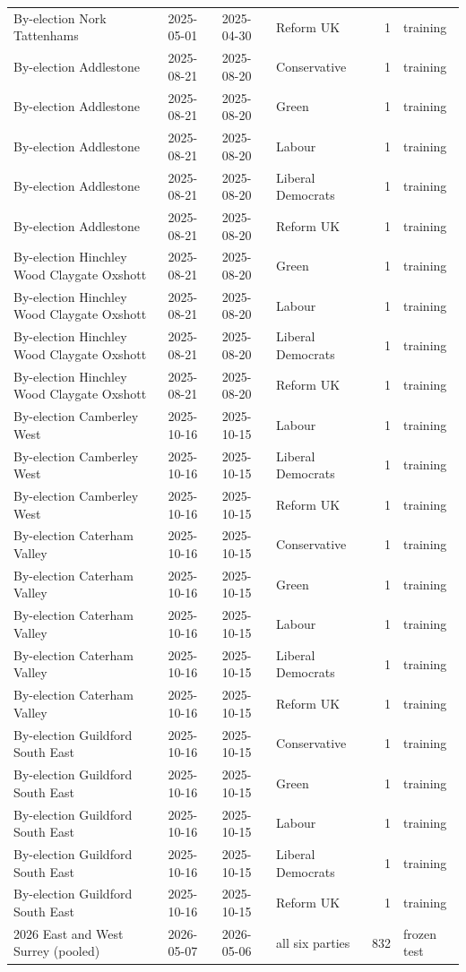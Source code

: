 \begin{tabular}{llllrl}
By-election Nork Tattenhams & 2025-05-01 & 2025-04-30 & Reform UK & 1 & training \\
By-election Addlestone & 2025-08-21 & 2025-08-20 & Conservative & 1 & training \\
By-election Addlestone & 2025-08-21 & 2025-08-20 & Green & 1 & training \\
By-election Addlestone & 2025-08-21 & 2025-08-20 & Labour & 1 & training \\
By-election Addlestone & 2025-08-21 & 2025-08-20 & Liberal Democrats & 1 & training \\
By-election Addlestone & 2025-08-21 & 2025-08-20 & Reform UK & 1 & training \\
By-election Hinchley Wood Claygate Oxshott & 2025-08-21 & 2025-08-20 & Green & 1 & training \\
By-election Hinchley Wood Claygate Oxshott & 2025-08-21 & 2025-08-20 & Labour & 1 & training \\
By-election Hinchley Wood Claygate Oxshott & 2025-08-21 & 2025-08-20 & Liberal Democrats & 1 & training \\
By-election Hinchley Wood Claygate Oxshott & 2025-08-21 & 2025-08-20 & Reform UK & 1 & training \\
By-election Camberley West & 2025-10-16 & 2025-10-15 & Labour & 1 & training \\
By-election Camberley West & 2025-10-16 & 2025-10-15 & Liberal Democrats & 1 & training \\
By-election Camberley West & 2025-10-16 & 2025-10-15 & Reform UK & 1 & training \\
By-election Caterham Valley & 2025-10-16 & 2025-10-15 & Conservative & 1 & training \\
By-election Caterham Valley & 2025-10-16 & 2025-10-15 & Green & 1 & training \\
By-election Caterham Valley & 2025-10-16 & 2025-10-15 & Labour & 1 & training \\
By-election Caterham Valley & 2025-10-16 & 2025-10-15 & Liberal Democrats & 1 & training \\
By-election Caterham Valley & 2025-10-16 & 2025-10-15 & Reform UK & 1 & training \\
By-election Guildford South East & 2025-10-16 & 2025-10-15 & Conservative & 1 & training \\
By-election Guildford South East & 2025-10-16 & 2025-10-15 & Green & 1 & training \\
By-election Guildford South East & 2025-10-16 & 2025-10-15 & Labour & 1 & training \\
By-election Guildford South East & 2025-10-16 & 2025-10-15 & Liberal Democrats & 1 & training \\
By-election Guildford South East & 2025-10-16 & 2025-10-15 & Reform UK & 1 & training \\
2026 East and West Surrey (pooled) & 2026-05-07 & 2026-05-06 & all six parties & 832 & frozen test \\
\bottomrule
\end{tabular}
